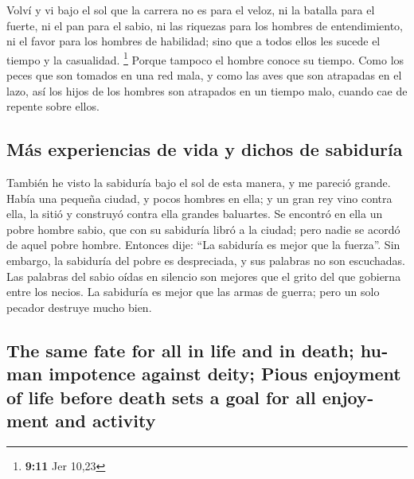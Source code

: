 \begin{paracol}{2}
 Volví y vi bajo el sol que la carrera no es para el
veloz, ni la batalla para el fuerte, ni el pan para el sabio, ni las
riquezas para los hombres de entendimiento, ni el favor para los hombres
de habilidad; sino que a todos ellos les sucede el tiempo y la
casualidad. \footnote{\textbf{9:11} Jer 10,23}  Porque
tampoco el hombre conoce su tiempo. Como los peces que son tomados en
una red mala, y como las aves que son atrapadas en el lazo, así los
hijos de los hombres son atrapados en un tiempo malo, cuando cae de
repente sobre ellos.

\hypertarget{muxe1s-experiencias-de-vida-y-dichos-de-sabiduruxeda}{%
\subsection{Más experiencias de vida y dichos de
sabiduría}\label{muxe1s-experiencias-de-vida-y-dichos-de-sabiduruxeda}}

 También he visto la sabiduría bajo el sol de esta
manera, y me pareció grande.  Había una pequeña ciudad, y
pocos hombres en ella; y un gran rey vino contra ella, la sitió y
construyó contra ella grandes baluartes.  Se encontró en
ella un pobre hombre sabio, que con su sabiduría libró a la ciudad; pero
nadie se acordó de aquel pobre hombre.  Entonces dije:
``La sabiduría es mejor que la fuerza''. Sin embargo, la sabiduría del
pobre es despreciada, y sus palabras no son escuchadas. 
Las palabras del sabio oídas en silencio son mejores que el grito del
que gobierna entre los necios.  La sabiduría es mejor que
las armas de guerra; pero un solo pecador destruye mucho bien.

\switchcolumn
\begin{otherlanguage}{english}

\hypertarget{the-same-fate-for-all-in-life-and-in-death-human-impotence-against-deity-pious-enjoyment-of-life-before-death-sets-a-goal-for-all-enjoyment-and-activity}{%
\subsection{The same fate for all in life and in death; human impotence
against deity; Pious enjoyment of life before death sets a goal for all
enjoyment and
activity}\label{the-same-fate-for-all-in-life-and-in-death-human-impotence-against-deity-pious-enjoyment-of-life-before-death-sets-a-goal-for-all-enjoyment-and-activity}}


\end{otherlanguage}
\end{paracol}
